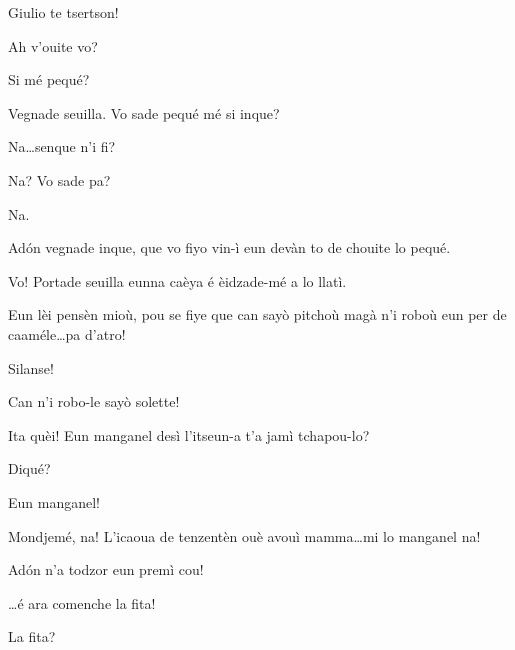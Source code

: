 \begin{drama}

\Michelspeaks Giulio te tsertson!


\Valletspeaks Ah v'ouite vo?

\Giuliospeaks{} Si mé pequé? 

\Valletspeaks Vegnade seuilla. Vo sade pequé mé si inque?

\Giuliospeaks Na\ldots senque n'i fi?

\Valletspeaks Na? Vo sade pa?

\Giuliospeaks Na.

\Valletspeaks Ad\'on vegnade inque, que vo fiyo vin-ì eun devàn to de chou\-i\-te lo pequé.


\Valletspeaks{} Vo! Portade seuilla eunna caèya é èidzade-mé a lo llatì.


\Giuliospeaks{} Eun lèi pensèn mioù, pou se fiye que can sayò pitchoù magà n'i roboù eun per de caaméle\ldots pa d’atro!

\Valletspeaks Silanse! 

\Giuliospeaks Can n'i robo-le sayò solette!


\Valletspeaks{} Ita quèi! Eun manganel desì l'itseun-a t'a jamì tcha\-pou-lo?

\Giuliospeaks Diqué?

\Valletspeaks Eun manganel!

\Giuliospeaks Mondjemé, na! L'icaoua de tenzentèn ouè avouì mamma\ldots mi lo manganel na!

\Valletspeaks Ad\'on n'a todzor eun premì cou!


\Valletspeaks \ldots é ara comenche la fita!

\Giuliospeaks La fita?



\end{drama}
